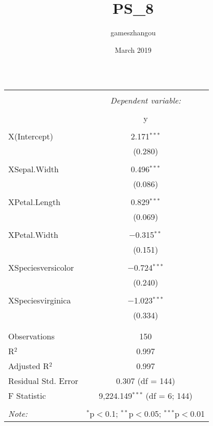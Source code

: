 \documentclass{article}
\title{PS_8}
\author{gameszhangou }
\date{March 2019}
\begin{document}
\begin{table}[!htbp] \centering 
  \caption{} 
  \label{} 
\begin{tabular}{@{\extracolsep{5pt}}lc} 
\\[-1.8ex]\hline 
\hline \\[-1.8ex] 
 & \multicolumn{1}{c}{\textit{Dependent variable:}} \\ 
\cline{2-2} 
\\[-1.8ex] & y \\ 
\hline \\[-1.8ex] 
 X(Intercept) & 2.171$^{***}$ \\ 
  & (0.280) \\ 
  & \\ 
 XSepal.Width & 0.496$^{***}$ \\ 
  & (0.086) \\ 
  & \\ 
 XPetal.Length & 0.829$^{***}$ \\ 
  & (0.069) \\ 
  & \\ 
 XPetal.Width & $-$0.315$^{**}$ \\ 
  & (0.151) \\ 
  & \\ 
 XSpeciesversicolor & $-$0.724$^{***}$ \\ 
  & (0.240) \\ 
  & \\ 
 XSpeciesvirginica & $-$1.023$^{***}$ \\ 
  & (0.334) \\ 
  & \\ 
\hline \\[-1.8ex] 
Observations & 150 \\ 
R$^{2}$ & 0.997 \\ 
Adjusted R$^{2}$ & 0.997 \\ 
Residual Std. Error & 0.307 (df = 144) \\ 
F Statistic & 9,224.149$^{***}$ (df = 6; 144) \\ 
\hline 
\hline \\[-1.8ex] 
\textit{Note:}  & \multicolumn{1}{r}{$^{*}$p$<$0.1; $^{**}$p$<$0.05; $^{***}$p$<$0.01} \\ 
\end{tabular} 
\end{table} 
\end{document}
